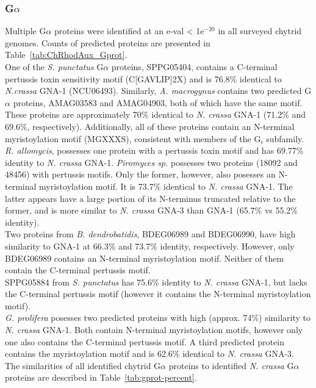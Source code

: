 \subsubsection*{G$\alpha$}
Multiple G$\alpha$ proteins were identified at an e-val < 1e$^{-20}$ in all surveyed chytrid genomes. Counts of predicted proteins are presented in Table~\ref{tab:ChRhodAux_Gprot}.\\
\indent One of the \textit{S. punctatus} G$\alpha$ proteins, SPPG05404, contains a C-terminal pertussis toxin sensitivity motif (C[GAVLIP]{2}X) and is 76.8\% identical to \textit{N.crassa} GNA-1 (NCU06493). Similarly, \textit{A. macrogynus} contains two predicted G$\alpha$ proteins, AMAG03583 and AMAG04903, both of which have the same motif. These proteins are approximately 70\% identical to \textit{N. crassa} GNA-1 (71.2\% and 69.6\%, respectively). Additionally, all of these proteins contain an N-terminal myristoylation motif (MGXXXS), consistent with members of the G$_{i}$ subfamily. \textit{R. allomycis}, possesses one protein with a pertussis toxin motif and has 69.77\% identity to \textit{N. crassa} GNA-1. \textit{Piromyces sp.} possesses two proteins (18092 and 48456) with pertussis motifs. Only the former, however, also posesses an N-terminal myristoylation motif. It is 73.7\% identical to \textit{N. crassa} GNA-1. The latter appears have a large portion of its N-terminus truncated relative to the former, and is more similar to \textit{N. crassa} GNA-3 than GNA-1 (65.7\% vs 55.2\% identity).\\
\indent Two proteins from \textit{B. dendrobatidis}, BDEG06989 and BDEG06990, have high similarity to GNA-1 at 66.3\% and 73.7\% identity, respectively. However, only BDEG06989 contains an N-terminal myristoylation motif. Neither of them contain the C-terminal pertussis motif.\\
\indent SPPG05884 from \textit{S. punctatus} has 75.6\% identity to \textit{N. crassa} GNA-1, but lacks the C-terminal pertussis motif (however it contains the N-terminal myristoylation motif).\\
\indent \textit{G. prolifera} posesses two predicted proteins with high (approx. 74\%) similarity to \textit{N. crassa} GNA-1. Both contain N-terminal myristoylation motifs, however only one also contains the C-terminal pertussis motif. A third predicted protein contains the myristoylation motif and is 62.6\% identical to \textit{N. crassa} GNA-3.\\
\indent The similarities of all identified chytrid G$\alpha$ proteins to identified \textit{N. crassa} G$\alpha$ proteins are described in Table~\ref{tab:gprot-percent}.\\
